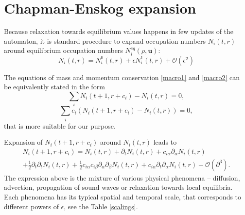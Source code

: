
\section{Chapman-Enskog expansion}
Because relaxation towards equilibrium values happens in few updates of the automaton, it is standard procedure to expand occupation numbers $N_i(t,r)$ around equilibrium occupation numbers $N_i^{eq}(\rho,\bm{u})$:
\begin{equation} \label{chap}
N_i(t,r) = N_i^0(t,r) + \epsilon N_i^1(t,r) + \mathcal{O}(\epsilon^2) 
\end{equation} 


The equations of mass and momentum conservation \ref{macro1} and \ref{macro2} can be equivalently stated in the form
\begin{equation} \label{macro_m}
\sum_i N_i(t+1,r+c_i) - N_i(t,r) = 0 ,
\end{equation}
\begin{equation} \label{macro_p}
\sum_i c_i (N_i(t+1,r+c_i) - N_i(t,r)) = 0,
\end{equation}
that is more suitable for our purpose.

Expansion of $N_i(t+1,r+c_i)$ around $N_i(t,r)$ leads to
\begin{equation} \label{rozvoj t+1}
\begin{split}
N_i(t+1,r+c_i) = N_i(t,r) + \partial_t N_i(t,r) + c_{i\alpha} \partial_{\alpha} N_i(t,r) \\ 
+ \frac{1}{2} \partial_t \partial_t N_i(t,r) + \frac{1}{2} c_{i\alpha}c_{i\beta} \partial_{\alpha} \partial_{\beta} N_i(t,r) + c_{i\alpha} \partial_t \partial_{\alpha} N_i(t,r) + \mathcal{O}(\partial^3).
\end{split}
\end{equation}
\bigskip
The expression above is the mixture of various physical phenomena -- diffusion, advection, propagation of sound waves or relaxation towards local equilibria. Each phenomena has its typical spatial and temporal scale, that corresponds to different powers of $\epsilon$, see the Table \ref{scalings}.

